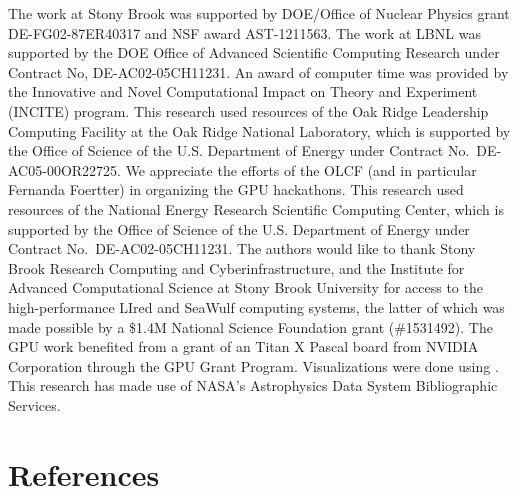 \documentclass[a4paper]{jpconf}
\begin{document}
\ack The work at Stony Brook was supported by DOE/Office of Nuclear
Physics grant DE-FG02-87ER40317 and NSF award AST-1211563.  The work
at LBNL was supported by the DOE Office of Advanced Scientific
Computing Research under Contract No, DE-AC02-05CH11231. An award of
computer time was provided by the Innovative and Novel Computational
Impact on Theory and Experiment (INCITE) program.  This research used
resources of the Oak Ridge Leadership Computing Facility at the Oak
Ridge National Laboratory, which is supported by the Office of Science
of the U.S. Department of Energy under Contract
No.\ DE-AC05-00OR22725.  We appreciate the efforts of the OLCF (and in
particular Fernanda Foertter) in organizing the GPU hackathons.  This
research used resources of the National Energy Research Scientific
Computing Center, which is supported by the Office of Science of the
U.S. Department of Energy under Contract No.\ DE-AC02-05CH11231.
The authors would like to thank Stony Brook Research Computing
and Cyberinfrastructure, and the Institute for Advanced Computational
Science at Stony Brook University for access to the high-performance
LIred and SeaWulf computing systems, the latter of which was made
possible by a \$1.4M National Science Foundation grant (\#1531492).
The GPU work benefited from a grant of an Titan X Pascal board
from NVIDIA Corporation through the GPU Grant Program.
Visualizations were done using \cite{yt}.  This research has
made use of NASA's Astrophysics Data System Bibliographic Services.

\section*{References}



\end{document}
